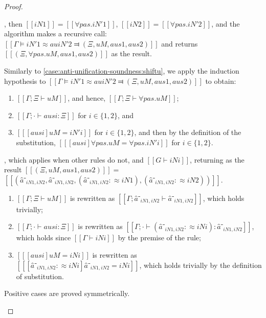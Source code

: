 \begin{proof}
\begin{caseof}
        \item {}, then $[[iN1]] = [[∀pas.iN'1]]$,
                $[[iN2]] = [[∀pas.iN'2]]$, and the algorithm makes a recursive call:
                $[[Γ ⊨ iN'1 ≈au iN'2 ⫤ (Ξ, uM, aus1, aus2)]]$ and
                returns $[[(Ξ, ∀pas.uM, aus1, aus2)]]$ as the result.

                Similarly to \cref{case:anti-unification-soundness:shiftu}, 
                we apply the induction hypothesis to
                $[[Γ ⊨ iN'1 ≈au iN'2 ⫤ (Ξ, uM, aus1, aus2)]]$ to obtain:
                \begin{enumerate}
                    \item $[[Γ; Ξ ⊢ uM]]$, and hence, $[[Γ ; Ξ ⊢ ∀pas.uM]]$;
                    \item $[[Γ; · ⊢ ausi : Ξ]]$ for $i \in \{1,2\}$, and
                    \item $[[ [ausi] uM = iN'i ]]$ for $i \in \{1,2\}$,
                        and then by the definition of the substitution,
                        $[[ [ausi] ∀pas.uM = ∀pas.iN'i ]]$ for $i \in \{1,2\}$. 
                \end{enumerate}

        \item {}, which applies 
        when other rules do not, and $[[G ⊢ iNi]]$,
        returning as the result $[[(Ξ, uM, aus1, aus2)]] = $
        $[[(â⁻_{iN1, iN2}, â⁻_{iN1, iN2}, (â⁻_{iN1, iN2} :≈ iN1) ,  (â⁻_{iN1, iN2} :≈ iN2))]]$.

        \begin{enumerate}
            \item $[[Γ ; Ξ ⊢ uM]]$ is rewritten as $[[Γ ; â⁻_{iN1, iN2} ⊢ â⁻_{iN1, iN2}]]$,
                which holds trivially;
            \item $[[Γ ; · ⊢ ausi : Ξ]]$ is rewritten as $[[Γ ; · ⊢ (â⁻_{iN1, iN2} :≈ iNi) : â⁻_{iN1, iN2}]]$,
                which holds since $[[Γ ⊢ iNi]]$ by the premise of the rule;
            \item $[[ [ausi] uM = iNi ]]$ is rewritten as $[[ [â⁻_{iN1, iN2} :≈ iNi] â⁻_{iN1, iN2} = iNi ]]$,
                which holds trivially by the definition of substitution.
        \end{enumerate}

        \item Positive cases are proved symmetrically.
    \end{caseof}
\end{proof}




